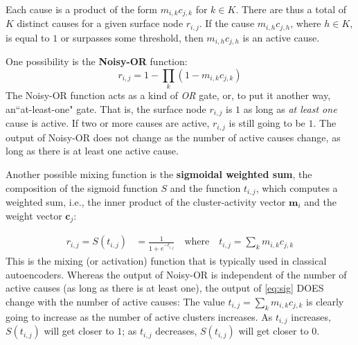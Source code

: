 Each cause is a product of the form $m_{i,k} c_{j,k}$ for $k \in K$.
There are thus a total of $K$ distinct causes for a given surface node $r_{i,j}$. 
If the cause $m_{i,h} c_{j,h}$, where $h \in K$, is equal to $1$ or surpasses some
threshold, then $m_{i,h} c_{j,h}$ is an active cause.

One possibility is the \textbf{Noisy-OR} function:
 \begin{equation}\label{eq:noisy-or}
  r_{i,j} = 1 - \prod\limits_{k} (1 - m_{i,k} c_{j,k})
 \end{equation}
 The Noisy-OR function acts as a kind of \textit{OR} gate, or, to put it another way, an``at-least-one" gate. That is, the surface node $r_{i,j}$ is $1$ as long as \emph{at least one} cause is active.
 If two or more causes are active,
$r_{i,j}$ is still going to be $1$. The output of Noisy-OR does not change as the number of active causes change, as long as there is at least one active cause.

Another possible mixing function is the \textbf{sigmoidal weighted sum}, the composition of the sigmoid function $S$ and the function $t_{i,j}$, which computes a weighted sum, i.e., the inner product of the cluster-activity vector $\mathbf{m}_i$ and the weight vector $\mathbf{c}_j$:

	\begin{align} %
	\label{eq:sig}
	r_{i,j} = S(t_{i,j}) &= \frac{1}{1 + e^{-t_{i,j}}} \quad %
	\text{where} \quad t_{i,j} = \sum_k m_{i,k} c_{j,k}
	\end{align}
This is the mixing (or activation) function that is typically used in classical autoencoders. 
Whereas the output of Noisy-OR is independent of the number of active causes (as long as there is at least one), the output of \eqref{eq:sig} DOES change with the number of active causes: The value $t_{i,j} = \sum_k m_{i,k} c_{j,k}$ is clearly going to increase as the number of active clusters increases.
As $t_{i,j}$ increases, $S(t_{i,j})$ will get closer to $1$; as %
$t_{i,j}$ 
decreases, $S(t_{i,j})$ will get closer to $0$.


